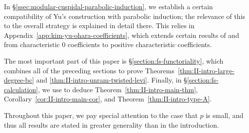 \documentclass[reqno]{amsart}
\numberwithin{equation}{subsection}
\theoremstyle{remark}
\numberwithin{equation}{subsection}
\numberwithin{figure}{subsection}
\begin{document}
In \S\ref{ssec:modular-cuspidal-parabolic-induction}, we establish a certain compatibility of Yu's construction with parabolic induction; the relevance of this to the overall strategy is explained in detail there. This relies in Appendix~\ref{app:kim-yu-ohara-coefficients}, which extends certain results of \cite{KY17} and \cite{Ohara24} from characteristic $0$ coefficients to positive characteristic coefficients.

The most important part of this paper is \S\ref{section:fs-functoriality}, which combines all of the preceding sections to prove Theorems~\ref{thm:II-intro-large-degree-bc} and \ref{thm:II-intro-unram-twisted-levi}. Finally, in \S\ref{section:fs-calculation}, we use \cite[Theorem 10.2.1]{CF26a} to deduce Theorem~\ref{thm:II-intro-main-thm}, Corollary~\ref{cor:II-intro-main-cor}, and Theorem~\ref{thm:II-intro-type-A}. 

Throughout this paper, we pay special attention to the case that $p$ is small, and thus all results are stated in greater generality than in the introduction.
\end{document}
